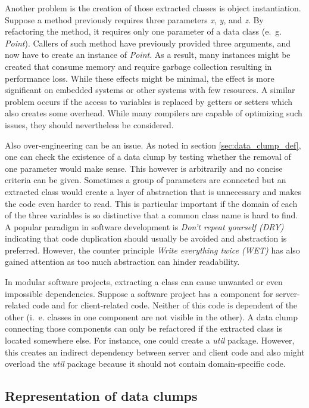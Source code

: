 Another problem is the creation of those extracted classes is object instantiation. Suppose a method previously requires three parameters \textit{x}, \textit{y}, and \textit{z}. By refactoring the method, it requires only one parameter of a data class (e.~g. \textit{Point}). Callers of such method have previously provided three arguments, and now have to create an instance of \textit{Point}. As a result, many instances might be created that consume memory and require garbage collection resulting in performance loss. While these effects might be minimal, the effect is more significant on embedded systems or other systems with few resources. A similar problem occurs if the access to variables is replaced by getters or setters which also creates some overhead. While many compilers are capable of optimizing such issues, they should nevertheless be considered. 

Also over-engineering can be an issue. As noted in section \ref{sec:data_clump_def}, one can check the existence of a data clump by testing whether the removal of one parameter would make sense. This however is arbitrarily and no concise criteria can be given. Sometimes a group of parameters are connected but an extracted class would create a layer of abstraction that is unnecessary and makes the code even harder to read. This is particular important if the domain of each of the three variables is so distinctive that a common class name is hard to find. 
A popular paradigm in software development is \textit{Don't repeat yourself (DRY)} indicating that code duplication should usually be avoided and abstraction is preferred. However, the counter principle \textit{Write everything twice (WET)} has also gained attention as too much abstraction can hinder readability. \cite{dry}

In modular software projects, extracting a class can cause unwanted or even impossible dependencies.  Suppose a software project has a component for server-related code and for client-related code. Neither of this code is dependent of the other (i.~e. classes in one component are not visible in the other). A data clump connecting those components can only be refactored if the extracted class is located somewhere else. For instance, one could create a \textit{util} package. However, this creates an indirect dependency between server and client code and also might overload the \textit{util} package because it should not contain domain-specific code. 


\subsection{Representation of data clumps}\label{sec:data_clump_graph}

